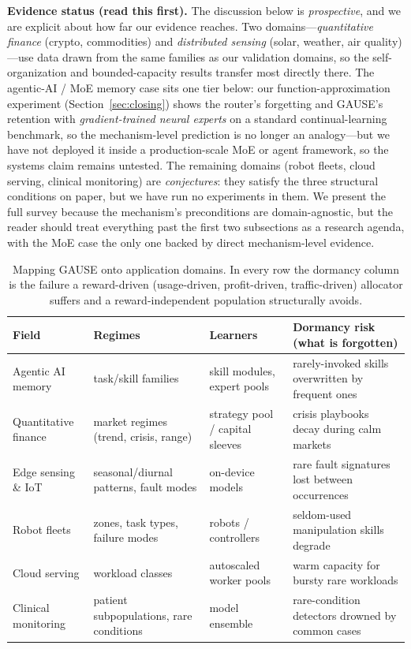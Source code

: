 \documentclass[10pt]{article}
\begin{document}
\noindent\textbf{Evidence status (read this first).} The discussion below is
\emph{prospective}, and we are explicit about how far our evidence reaches. Two
domains---\emph{quantitative finance} (crypto, commodities) and \emph{distributed
sensing} (solar, weather, air quality)---use data drawn from the same families as
our validation domains, so the self-organization and bounded-capacity results
transfer most directly there. The agentic-AI / MoE memory case sits one tier below:
our function-approximation experiment (Section~\ref{sec:closing}) shows the router's
forgetting and GAUSE's retention with \emph{gradient-trained neural experts} on a
standard continual-learning benchmark, so the mechanism-level prediction is no longer
an analogy---but we have not deployed it inside a production-scale MoE or agent
framework, so the systems claim remains untested. The remaining domains (robot
fleets, cloud serving, clinical monitoring) are \emph{conjectures}: they satisfy the
three structural conditions on paper, but we have run no experiments in them. We
present the full survey because the mechanism's preconditions are domain-agnostic,
but the reader should treat everything past the first two subsections as a research
agenda, with the MoE case the only one backed by direct mechanism-level evidence.

\begin{table}[h]
\centering
\small
\begin{tabular}{p{3.0cm} p{3.1cm} p{3.1cm} p{4.4cm}}
\toprule
\textbf{Field} & \textbf{Regimes} & \textbf{Learners} &
\textbf{Dormancy risk (what is forgotten)} \\
\midrule
Agentic AI memory & task/skill families & skill modules, expert pools &
rarely-invoked skills overwritten by frequent ones \\
Quantitative finance & market regimes (trend, crisis, range) &
strategy pool / capital sleeves & crisis playbooks decay during calm
markets \\
Edge sensing \& IoT & seasonal/diurnal patterns, fault modes &
on-device models & rare fault signatures lost between
occurrences \\
Robot fleets & zones, task types, failure modes & robots / controllers &
seldom-used manipulation skills degrade \\
Cloud serving & workload classes & autoscaled worker pools &
warm capacity for bursty rare workloads \\
Clinical monitoring & patient subpopulations, rare conditions &
model ensemble & rare-condition detectors drowned by common cases \\
\bottomrule
\end{tabular}
\caption{Mapping GAUSE onto application domains. In every row the
dormancy column is the failure a reward-driven (usage-driven, profit-driven,
traffic-driven) allocator suffers and a reward-independent population
structurally avoids.}
\label{tab:apps}
\end{table}
\end{document}
